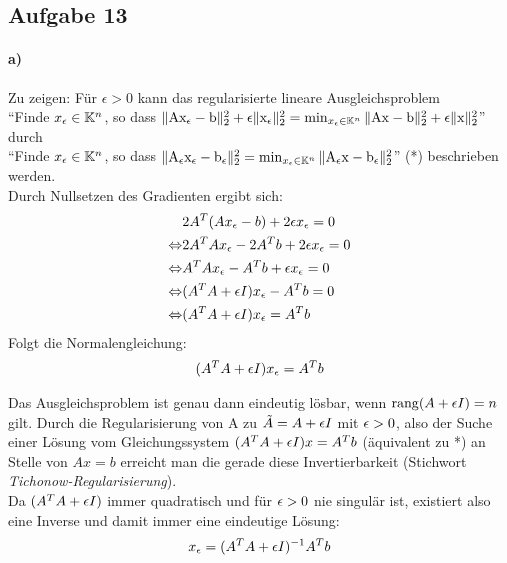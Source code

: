 \subsection*{Aufgabe 13}

\paragraph*{a)}
Zu zeigen: Für $\epsilon > 0$ kann das regularisierte lineare Ausgleichsproblem\\
\newline
"`Finde $x_\epsilon \in \mathbb K^n$, so dass $\mathrm{\| Ax_\epsilon - b \|_2^2} + \epsilon\mathrm{\| x_\epsilon \|_2^2} = \min_{x_\epsilon \in \mathbb K^n}\mathrm{\| Ax - b \|_2^2} + \epsilon\mathrm{\| x \|_2^2}$"'  durch\\
\newline
"`Finde $x_\epsilon \in \mathbb K^n$, so dass $\mathrm{\| A_\epsilon x_\epsilon - b_\epsilon \|_2^2} = \min_{x_\epsilon \in \mathbb K^n}\mathrm{\| A_\epsilon x - b_\epsilon \|_2^2}$"' (*) beschrieben werden.\\
\newline
Durch Nullsetzen des Gradienten ergibt sich:
\begin{align*}
&2A^T(Ax_\epsilon-b)+2\epsilon x_\epsilon = 0\\
\Leftrightarrow &2A^TAx_\epsilon -2A^Tb +2\epsilon x_\epsilon = 0\\
\Leftrightarrow &A^TAx_\epsilon -A^Tb +\epsilon x_\epsilon = 0\\
\Leftrightarrow &(A^TA +\epsilon I)x_\epsilon-A^Tb  = 0\\
\Leftrightarrow &(A^TA +\epsilon I) x_\epsilon = A^Tb\\
\end{align*}
Folgt die Normalengleichung:
\begin{align}(A^TA + \epsilon I)x_\epsilon = A^Tb\label{NGL}\end{align}

Das Ausgleichsproblem ist genau dann eindeutig lösbar, wenn $\mathrm{rang}(A+\epsilon I)=n$ gilt.
Durch die Regularisierung von A zu $\tilde{A}= A +\epsilon I$ mit $\epsilon>0$, also der Suche einer Lösung vom Gleichungssystem $(A^TA+\epsilon I)x=A^Tb$ (äquivalent zu *) an Stelle von $Ax=b$ erreicht man die gerade diese Invertierbarkeit (Stichwort \textit{Tichonow-Regularisierung}).\\
Da $(A^TA + \epsilon I)$ immer quadratisch und für $\epsilon > 0$ nie singulär ist, existiert also eine Inverse und damit immer eine eindeutige Lösung:
\begin{align}x_\epsilon = (A^TA + \epsilon I)^{-1}A^Tb\label{xeps}\end{align}


